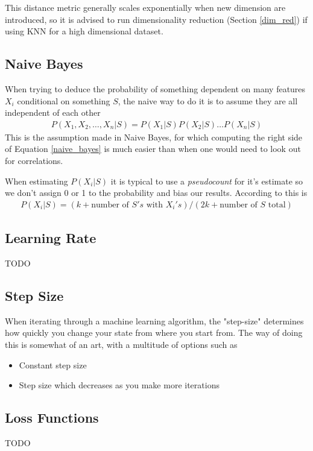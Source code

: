 This distance metric generally scales exponentially when new dimension are introduced, so it is advised to run dimensionality reduction (Section \ref{dim_red}) if using KNN for a high dimensional dataset.
\subsection{Naive Bayes}
When trying to deduce the probability of something dependent on many features $X_i$ conditional on something $S$, the naive way to do it is to assume they are all independent of each other
\begin{align}\label{naive_bayes}
	P(X_1,X_2,\dots,X_n|S) = P(X_1|S)P(X_2|S)\dots P(X_n|S)
\end{align}
This is the assumption made in Naive Bayes, for which computing the right side of Equation \ref{naive_bayes} is much easier than when one would need to look out for correlations.

When estimating $P(X_i|S)$ it is typical to use a \textit{pseudocount} for it's estimate so we don't assign 0 or 1 to the probability and bias our results. According to \cite{sutton} this is
\begin{align}
	P(X_i|S) = (k+\textrm{number~of~} S's\textrm{~with~} X_i's) / (2k+\textrm{number~of~} S \textrm{~total})
\end{align}


\subsection{Learning Rate}
TODO

\subsection{Step Size}
When iterating through a machine learning algorithm, the "step-size" determines how quickly you change your state from where you start from. The way of doing this is somewhat of an art, with a multitude of options such as 
\begin{itemize}
	\item Constant step size
	\item Step size which decreases as you make more iterations
\end{itemize}

\subsection{Loss Functions}
TODO
